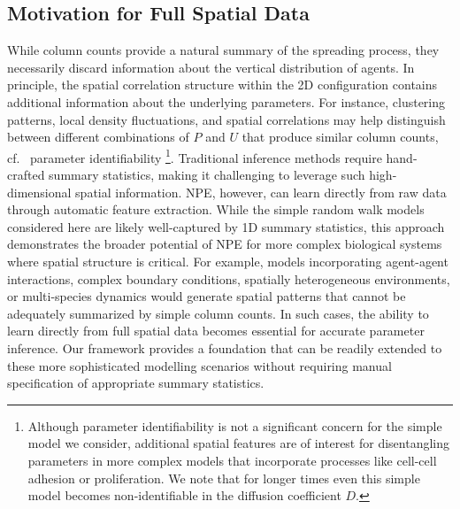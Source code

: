 \documentclass{article}
\providecommand{\DIFaddtex}[1]{{\protect\color{blue} \sf #1}} %
\providecommand{\DIFdeltex}[1]{{\protect\color{red} \scriptsize #1}} %
\providecommand{\DIFaddbegin}{} %
\providecommand{\DIFaddend}{} %
\providecommand{\DIFdelbegin}{} %
\providecommand{\DIFdelend}{} %
\providecommand{\DIFadd}[1]{\texorpdfstring{\DIFaddtex{#1}}{#1}} %
\providecommand{\DIFdel}[1]{\texorpdfstring{\DIFdeltex{#1}}{}} %
\newcommand{\DIFscaledelfig}{0.5}
\newlength{\DIFdelgraphicswidth} %
\newlength{\DIFdelgraphicsheight} %
\newcommand{\DIFaddincludegraphics}[2][]{{\color{blue}\fbox{\DIFOincludegraphics[#1]{#2}}}} %
\newcommand{\DIFdelincludegraphics}[2][]{%
\sbox{\DIFdelgraphicsbox}{\DIFOincludegraphics[#1]{#2}}%
\settoboxwidth{\DIFdelgraphicswidth}{\DIFdelgraphicsbox} %
\settoboxtotalheight{\DIFdelgraphicsheight}{\DIFdelgraphicsbox} %
\scalebox{\DIFscaledelfig}{%
\parbox[b]{\DIFdelgraphicswidth}{\usebox{\DIFdelgraphicsbox}\\[-\baselineskip] \rule{\DIFdelgraphicswidth}{0em}}\llap{\resizebox{\DIFdelgraphicswidth}{\DIFdelgraphicsheight}{%
\setlength{\unitlength}{\DIFdelgraphicswidth}%
\begin{picture}(1,1)%
\thicklines\linethickness{2pt} %
{\color[rgb]{1,0,0}\put(0,0){\framebox(1,1){}}}%
{\color[rgb]{1,0,0}\put(0,0){\line( 1,1){1}}}%
{\color[rgb]{1,0,0}\put(0,1){\line(1,-1){1}}}%
\end{picture}%
}\hspace*{3pt}}} %
} %
\DeclareRobustCommand{\DIFaddbegin}{\DIFOaddbegin \let\includegraphics\DIFaddincludegraphics} %
\DeclareRobustCommand{\DIFaddend}{\DIFOaddend \let\includegraphics\DIFOincludegraphics} %
\DeclareRobustCommand{\DIFdelbegin}{\DIFOdelbegin \let\includegraphics\DIFdelincludegraphics} %
\DeclareRobustCommand{\DIFdelend}{\DIFOaddend \let\includegraphics\DIFOincludegraphics} %
\begin{document}
\DIFdelbegin \subsection{\DIFdel{Motivation for Full Spatial Data}}
\addtocounter{subsection}{-1}%
\DIFdelend While column counts provide a natural summary of the spreading process, they necessarily discard information about the vertical distribution of agents. In principle, the spatial correlation structure within the 2D configuration contains additional information about the underlying parameters. For instance, clustering patterns, local density fluctuations, and spatial correlations may help distinguish between different combinations of $P$ and $U$ that produce similar column counts, cf.\DIFaddbegin \DIFadd{\ }\DIFaddend parameter identifiability \footnote{Although parameter identifiability is not a significant concern for the simple model we consider, additional spatial features are of interest for disentangling parameters in more complex models that incorporate processes like cell-cell adhesion or proliferation. We note that for longer times even this simple model becomes non-identifiable in the diffusion coefficient $D$.}. \DIFdelbegin \DIFdel{Traditional inference methods require hand-crafted summary statistics, making it challenging to leverage such high-dimensional spatial information. NPE, however, can learn directly from raw data through automatic feature extraction. While the simple random walk models considered here are likely well-captured by 1D summary statistics, this approach demonstrates the broader potential of NPE for more complex biological systems where spatial structure is critical. }\DIFdelend For example, models incorporating agent-agent interactions, complex boundary conditions, spatially heterogeneous environments, or multi-species dynamics would generate spatial patterns that cannot be adequately summarized by simple column counts.
\DIFdelbegin \DIFdel{In such cases, the ability to learn directly from full spatial data becomes essential for accurate parameter inference. Our framework provides a foundation that can be readily extended to these more sophisticated modelling scenarios without requiring manual specification of appropriate summary statistics.
}\DIFdelend 
\end{document}
